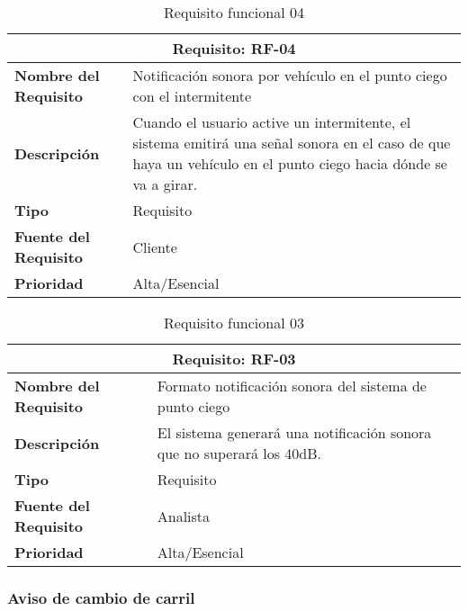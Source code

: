 \begin{table}[H]
\begin{center}
\begin{tabular}{p{} p{7cm}}
\multicolumn{2}{c}{\textbf{Requisito: RF-04} } \\
\hline \hline
\textbf{Nombre del Requisito} & Notificación sonora por vehículo en el punto ciego con el intermitente  \\
\hline
\textbf{Descripción} &  Cuando el usuario active un intermitente, el sistema emitirá una señal sonora en el caso de que haya un vehículo en el punto ciego hacia dónde se va a girar. \\
\hline
\textbf{Tipo} & Requisito  \\
\hline
\textbf{Fuente del Requisito} & Cliente  \\
\hline
\textbf{Prioridad} & Alta/Esencial  \\ \hline
\end{tabular}
\caption{Requisito funcional 04}
\label{tab:personal}
\end{center}
\end{table}

\begin{table}[H]
\begin{center}
\begin{tabular}{p{} p{7cm}}
\multicolumn{2}{c}{\textbf{Requisito: RF-03} } \\
\hline \hline
\textbf{Nombre del Requisito} & Formato notificación sonora del sistema de punto ciego\\
\hline
\textbf{Descripción} & El sistema generará una notificación sonora que no superará los 40dB.\\
\hline
\textbf{Tipo} & Requisito  \\
\hline
\textbf{Fuente del Requisito} & Analista  \\
\hline
\textbf{Prioridad} & Alta/Esencial  \\ \hline
\end{tabular}
\caption{Requisito funcional 03}
\label{tab:personal}
\end{center}
\end{table}


\subsubsection{Aviso de cambio de carril}

